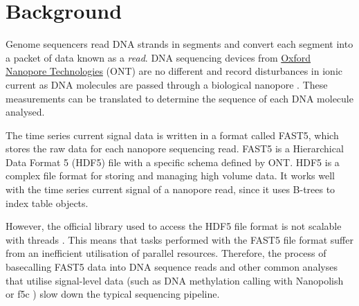\section{Background}
\label{sec:back}

Genome sequencers read DNA strands in segments and convert each segment into a packet of data known as a \textit{read}. DNA sequencing devices from \href{https://nanoporetech.com/}{Oxford Nanopore Technologies} (ONT) are no different and record disturbances in ionic current as DNA molecules are passed through a biological nanopore \cite{fast5}. These measurements can be translated to determine the sequence of each DNA molecule analysed.

The time series current signal data is written in a format called FAST5, which stores the raw data for each nanopore sequencing read. FAST5 is a Hierarchical Data Format 5 (HDF5) file \cite{hdf5:specs} with a specific schema defined by ONT. HDF5 is a complex file format for storing and managing high volume data. It works well with the time series current signal of a nanopore read, since it uses B-trees to index table objects.

However, the official library used to access the HDF5 file format is not scalable with threads \cite{hdf5:nomulti}. This means that tasks performed with the FAST5 file format suffer from an inefficient utilisation of parallel resources. Therefore, the process of basecalling FAST5 data into DNA sequence reads and other common analyses that utilise signal-level data (such as DNA methylation calling with Nanopolish \cite{nanopolish} or f5c \cite{f5c}) slow down the typical sequencing pipeline.
